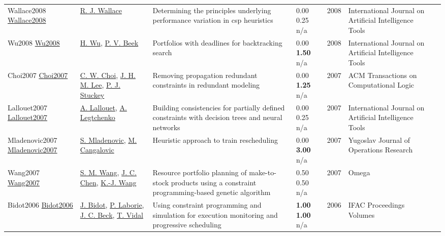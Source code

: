 {\begin{longtable}{p{3cm}p{5cm}p{10cm}p{1cm}rp{2.5cm}l}
Wallace2008 \href{http://dx.doi.org/10.1142/s0218213008004199}{Wallace2008} & \hyperref[auth:a1268]{R. J. Wallace} & Determining the principles underlying performance variation in csp heuristics & \noindent{}\textcolor{black!50}{0.00} 0.25 n/a & 2008 & International Journal on Artificial Intelligence Tools & \cite{Wallace2008}\\
Wu2008 \href{http://dx.doi.org/10.1142/s0218213008004187}{Wu2008} & \hyperref[auth:a2060]{H. Wu}, \hyperref[auth:a2061]{P. V. Beek} & Portfolios with deadlines for backtracking search & \noindent{}\textcolor{black!50}{0.00} \textbf{1.50} n/a & 2008 & International Journal on Artificial Intelligence Tools & \cite{Wu2008}\\
Choi2007 \href{http://dx.doi.org/10.1145/1276920.1276925}{Choi2007} & \hyperref[auth:a1816]{C. W. Choi}, \hyperref[auth:a1817]{J. H. M. Lee}, \hyperref[auth:a1818]{P. J. Stuckey} & \cellcolor{green!10}Removing propagation redundant constraints in redundant modeling & \noindent{}\textcolor{black!50}{0.00} \textbf{1.25} n/a & 2007 & ACM Transactions on Computational Logic & \cite{Choi2007}\\
Lallouet2007 \href{http://dx.doi.org/10.1142/s0218213007003503}{Lallouet2007} & \hyperref[auth:a428]{A. Lallouet}, \hyperref[auth:a1935]{A. Legtchenko} & Building consistencies for partially defined constraints with decision trees and neural networks & \noindent{}\textcolor{black!50}{0.00} 0.25 n/a & 2007 & International Journal on Artificial Intelligence Tools & \cite{Lallouet2007}\\
Mladenovic2007 \href{http://dx.doi.org/10.2298/yjor0701009m}{Mladenovic2007} & \hyperref[auth:a1621]{S. Mladenovic}, \hyperref[auth:a1717]{M. Cangalovic} & \cellcolor{gold!20}Heuristic approach to train rescheduling & \noindent{}\textcolor{black!50}{0.00} \textbf{3.00} n/a & 2007 & Yugoslav Journal of Operations Research & \cite{Mladenovic2007}\\
Wang2007 \href{http://dx.doi.org/10.1016/j.omega.2005.06.001}{Wang2007} & \hyperref[auth:a1936]{S. M. Wang}, \hyperref[auth:a1937]{J. C. Chen}, \hyperref[auth:a1938]{K.-J. Wang} & Resource portfolio planning of make-to-stock products using a constraint programming-based genetic algorithm & \noindent{}0.50 0.50 n/a & 2007 & Omega & \cite{Wang2007}\\
Bidot2006 \href{http://dx.doi.org/10.3182/20060517-3-fr-2903.00313}{Bidot2006} & \hyperref[auth:a824]{J. Bidot}, \hyperref[auth:a118]{P. Laborie}, \hyperref[auth:a89]{J. C. Beck}, \hyperref[auth:a825]{T. Vidal} & \cellcolor{gold!20}Using constraint programming and simulation for execution monitoring and progressive scheduling & \noindent{}\textbf{1.00} \textbf{1.00} n/a & 2006 & IFAC Proceedings Volumes & \cite{Bidot2006}\\

\end{longtable}}
